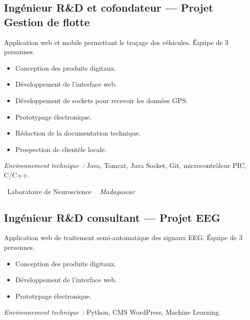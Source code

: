 \documentclass[10pt,a4paper]{article}
\begin{document}
\subsection*{Ingénieur R\&D et cofondateur --- Projet Gestion de flotte}
\color{darkgray}
Application web et mobile permettant le traçage des véhicules. Équipe de 3 personnes.
\begin{itemize}
  \item Conception des produits digitaux.
  \item Développement de l'interface web.
  \item Développement de sockets pour recevoir les données GPS.
  \item Prototypage électronique.
  \item Rédaction de la documentation technique.
  \item Prospection de clientèle locale.
\end{itemize}
\textit{Environnement technique~:} Java, Tomcat, Java Socket, Git, microcontrôleur PIC, C/C++.

\vspace{10pt}

\noindent\textcolor{primary}{ \faBuilding\ Laboratoire de Neuroscience} \quad
\textit{ \small \textcolor{darkgray}{ \faMapMarker\ } Madagascar }

\vspace{4pt}

\subsection*{Ingénieur R\&D consultant --- Projet EEG}
\color{darkgray}
Application web de traitement semi-automatique des signaux EEG. Équipe de 3 personnes.
\begin{itemize}
  \item Conception des produits digitaux.
  \item Développement de l'interface web.
  \item Prototypage électronique.
\end{itemize}
\textit{Environnement technique~:} Python, CMS WordPress, Machine Learning.

\vspace{14pt}
\end{document}

